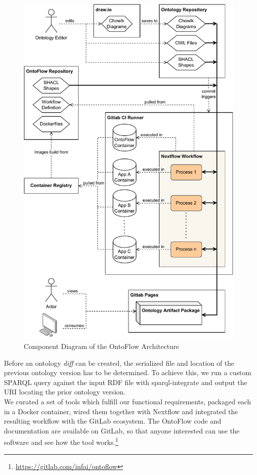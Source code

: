 \documentclass[runningheads]{llncs}
\begin{document}
\begin{figure}[htbp]
	\centering
	\includegraphics[width=.75\textwidth]{architecture.pdf}
	\caption{Component Diagram of the OntoFlow Architecture}
	\label{fig:architecture}
\end{figure}
Before an ontology \textit{diff} can be created, the serialized file and location of the previous ontology version has to be determined. To achieve this, we run a custom SPARQL query against the input RDF file with sparql-integrate and output the URI locating the prior ontology version.\\
We curated a set of tools which fulfill our functional requirements, packaged each in a Docker container, wired them together with Nextflow and integrated the resulting workflow with the GitLab ecosystem.
The OntoFlow code and documentation are available on GitLab, so that anyone interested can use the software and see how the tool works.\footnote{\url{https://gitlab.com/infai/ontoflow}}
\end{document}
